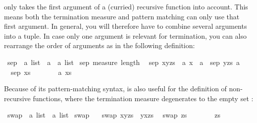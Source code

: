 \begin{isabellebody}
\begin{isamarkuptext}
\begin{warn}
   only takes the first argument of a (curried)
  recursive function into account. This means both the termination measure
  and pattern matching can only use that first argument. In general, you will
  therefore have to combine several arguments into a tuple. In case only one
  argument is relevant for termination, you can also rearrange the order of
  arguments as in the following definition:
\end{warn}%
\end{isamarkuptext}%
\isamarkuptrue%
\isamarkupfalse%
\ sep{}\ {\isacharcolon}{\isacharcolon}\ {\isachardoublequoteopen}{\isacharprime}a\ list\ {\isasymRightarrow}\ {\isacharprime}a\ {\isasymRightarrow}\ {\isacharprime}a\ list{\isachardoublequoteclose}\isanewline
{}\isamarkupfalse%
\ sep{}\ {\isachardoublequoteopen}measure\ length{\isachardoublequoteclose}\isanewline
\ \ {\isachardoublequoteopen}sep{}\ {\isacharparenleft}x{\isacharhash}y{\isacharhash}zs{\isacharparenright}\ {\isacharequal}\ {\isacharparenleft}{\isasymlambda}a{\isachardot}\ x\ {\isacharhash}\ a\ {\isacharhash}\ sep{}\ {\isacharparenleft}y{\isacharhash}zs{\isacharparenright}\ a{\isacharparenright}{\isachardoublequoteclose}\isanewline
\ \ {\isachardoublequoteopen}sep{}\ xs\ \ \ \ \ \ \ {\isacharequal}\ {\isacharparenleft}{\isasymlambda}a{\isachardot}\ xs{\isacharparenright}{\isachardoublequoteclose}%
\begin{isamarkuptext}%
Because of its pattern-matching syntax,  is also useful
for the definition of non-recursive functions, where the termination measure
degenerates to the empty set \isa{{\isacharbraceleft}{\isacharbraceright}}:%
\end{isamarkuptext}%
\isamarkuptrue%
\isamarkupfalse%
\ swap{}{}\ {\isacharcolon}{\isacharcolon}\ {\isachardoublequoteopen}{\isacharprime}a\ list\ {\isasymRightarrow}\ {\isacharprime}a\ list{\isachardoublequoteclose}\isanewline
{}\isamarkupfalse%
\ swap{}{}\ {\isachardoublequoteopen}{\isacharbraceleft}{\isacharbraceright}{\isachardoublequoteclose}\isanewline
\ \ {\isachardoublequoteopen}swap{}{}\ {\isacharparenleft}x{\isacharhash}y{\isacharhash}zs{\isacharparenright}\ {\isacharequal}\ y{\isacharhash}x{\isacharhash}zs{\isachardoublequoteclose}\isanewline
\ \ {\isachardoublequoteopen}swap{}{}\ zs\ \ \ \ \ \ \ {\isacharequal}\ zs{\isachardoublequoteclose}\isanewline
%
\isadelimtheory
%
\endisadelimtheory
%
\isatagtheory
%
\endisatagtheory
{\isafoldtheory}%
%
\isadelimtheory
%
\endisadelimtheory
\end{isabellebody}%
